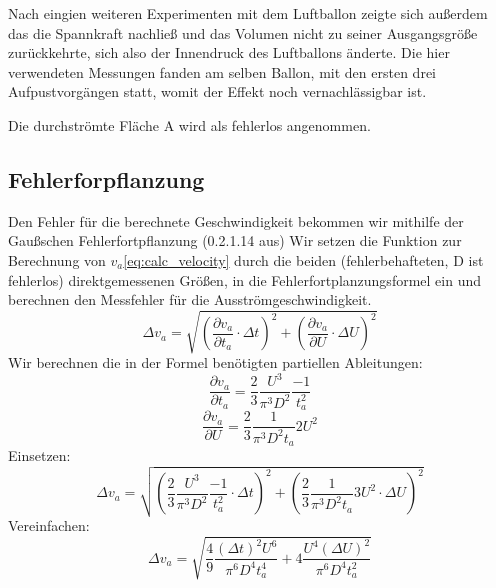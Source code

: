 \documentclass{article}
\begin{document}
            Nach eingien weiteren Experimenten mit dem Luftballon zeigte sich außerdem das die Spannkraft nachließ und das Volumen
            nicht zu seiner Ausgangsgröße zurückkehrte, sich also der Innendruck des Luftballons änderte.
            Die hier verwendeten Messungen fanden am selben Ballon, mit den ersten drei Aufpustvorgängen statt, womit der Effekt noch vernachlässigbar ist.

            Die durchströmte Fläche A wird als fehlerlos angenommen.

        \subsection{Fehlerforpflanzung}
            Den Fehler für die berechnete Geschwindigkeit bekommen wir mithilfe der Gaußschen Fehlerfortpflanzung (0.2.1.14 aus\cite{AnleitungPraktikum})
            Wir setzen die Funktion zur Berechnung von \(v_a\)\ref{eq:calc_velocity} durch die beiden (fehlerbehafteten, D ist fehlerlos)
            direktgemessenen Größen, in die Fehlerfortplanzungsformel ein und berechnen den Messfehler für die Ausströmgeschwindigkeit. 
            \begin{equation}
                \Delta v_a = \sqrt{ {\left( \frac{ \partial v_a }{ \partial t_a } \cdot \Delta t \right)}^2 + {\left( \frac{ \partial v_a }{ \partial U } \cdot \Delta U \right)}^2 }
            \end{equation}
            Wir berechnen die in der Formel benötigten partiellen Ableitungen:
            \begin{equation}
                 \frac{\partial v_a}{ \partial t_a} = \frac{2}{3} \frac{U^3}{\pi^3 D^2} \frac{-1}{t_a^2}
            \end{equation}
            \begin{equation}
                \frac{\partial v_a}{ \partial U} = \frac{2}{3} \frac{1}{\pi^3 D^2 t_a} 2 U^2
            \end{equation}
            Einsetzen:
            \begin{equation}
                \Delta v_a = \sqrt{ {\left( \frac{2}{3} \frac{U^3}{\pi^3 D^2} \frac{-1}{t_a^2} \cdot \Delta t \right) }^2 
                + {\left( \frac{2}{3} \frac{1}{\pi^3 D^2 t_a} 3 U^2 \cdot \Delta U \right)}^2 }
            \end{equation}
            Vereinfachen:
            \begin{equation} \label{eq:fehler}
                \Delta v_a = \sqrt{ \frac{4}{9} \frac{ {(\Delta t)}^2 U^6}{\pi^6 D^4 t_a^4} + 4 \frac{U^4 {(\Delta U)}^2}{\pi^6 D^4 t_a^2}}
            \end{equation}
\end{document}
